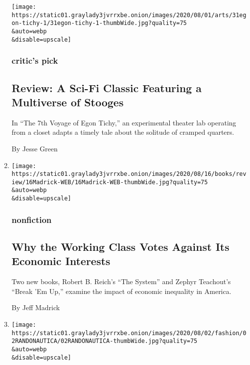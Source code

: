 \begin{enumerate}
  \texttt{[image: https://static01.graylady3jvrrxbe.onion/images/2020/08/01/arts/31egon-tichy-1/31egon-tichy-1-thumbWide.jpg?quality=75\\\&auto=webp\\\&disable=upscale]}

  \hypertarget{critics-pick}{%
  \subsubsection{critic's pick}\label{critics-pick}}

  \hypertarget{review-a-sci-fi-classic-featuring-a-multiverse-of-stooges}{%
  \subsection{Review: A Sci-Fi Classic Featuring a Multiverse of
  Stooges}\label{review-a-sci-fi-classic-featuring-a-multiverse-of-stooges}}

  In ``The 7th Voyage of Egon Tichy,'' an experimental theater lab
  operating from a closet adapts a timely tale about the solitude of
  cramped quarters.

  By Jesse Green
\item
  \href{/2020/07/31/books/review/the-system-robert-reich-break-em-up-zephyr-teachout.html}{}

  \texttt{[image: https://static01.graylady3jvrrxbe.onion/images/2020/08/16/books/review/16Madrick-WEB/16Madrick-WEB-thumbWide.jpg?quality=75\\\&auto=webp\\\&disable=upscale]}

  \hypertarget{nonfiction}{%
  \subsubsection{nonfiction}\label{nonfiction}}

  \hypertarget{why-the-working-class-votes-against-its-economic-interests}{%
  \subsection{Why the Working Class Votes Against Its Economic
  Interests}\label{why-the-working-class-votes-against-its-economic-interests}}

  Two new books, Robert B. Reich's ``The System'' and Zephyr Teachout's
  ``Break 'Em Up,'' examine the impact of economic inequality in
  America.

  By Jeff Madrick
\item
  \href{/2020/07/31/style/randonautica-app.html}{}

  \texttt{[image: https://static01.graylady3jvrrxbe.onion/images/2020/08/02/fashion/02RANDONAUTICA/02RANDONAUTICA-thumbWide.jpg?quality=75\\\&auto=webp\\\&disable=upscale]}


\end{enumerate}
